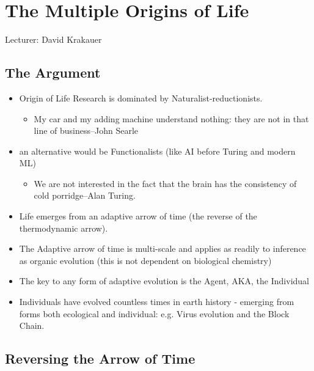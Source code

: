 \documentclass[]{article}
\begin{document}
\section{The Multiple Origins of Life}

Lecturer: David Krakauer

\subsection{The Argument}

\begin{itemize}
	\item Origin of Life Research is dominated by Naturalist-reductionists.
	\begin{itemize}
		\item My car and my adding machine 	understand nothing: they are
		not in that line of business--John Searle
	\end{itemize}
	\item an alternative would be Functionalists (like AI before Turing and modern ML)
	\begin{itemize}
		\item We are not interested in the fact that the brain has the consistency of cold porridge--Alan Turing.
	\end{itemize}
	\item Life emerges from an adaptive arrow of time (the reverse of the thermodynamic arrow).
	\item The Adaptive arrow of time is multi-scale and applies as readily to inference as organic evolution (this is not dependent on biological chemistry)
	\item The key to any form of adaptive evolution is the Agent, AKA, the Individual
	\item Individuals have evolved countless times in earth history - emerging from
	forms both ecological and individual: e.g. Virus evolution and the Block Chain.
\end{itemize}

\subsection{Reversing the Arrow of Time}
\end{document}
